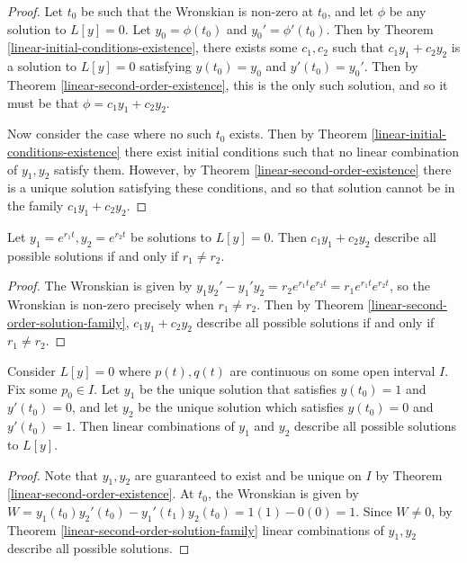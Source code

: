 \begin{proof}
    Let $t_0$ be such that the Wronskian is non-zero at $t_0$, and let $\phi$ be any solution to $L[y] = 0$. Let $y_0 = \phi(t_0)$ and $y_0' = \phi'(t_0)$. Then by Theorem \ref{linear-initial-conditions-existence}, there exists some $c_1, c_2$ such that $c_1y_1 + c_2y_2$ is a solution to $L[y] = 0$ satisfying $y(t_0) = y_0$ and $y'(t_0) = y_0'$. Then by Theorem \ref{linear-second-order-existence}, this is the only such solution, and so it must be that $\phi = c_1y_1 + c_2y_2$.

    Now consider the case where no such $t_0$ exists. Then by Theorem \ref{linear-initial-conditions-existence} there exist initial conditions such that no linear combination of $y_1, y_2$ satisfy them. However, by Theorem \ref{linear-second-order-existence} there is a unique solution satisfying these conditions, and so that solution cannot be in the family $c_1y_1 + c_2y_2$.
\end{proof}

\begin{prop}
    Let $y_1 = e^{r_1t}, y_2 = e^{r_2t}$ be solutions to $L[y] = 0$. Then $c_1y_1 + c_2y_2$ describe all possible solutions if and only if $r_1 \neq r_2$.
\end{prop}

\begin{proof}
    The Wronskian is given by $y_1y_2' - y_1'y_2 = r_2e^{r_1t}e^{r_2t} = r_1e^{r_1t}e^{r_2t}$, so the Wronskian is non-zero precisely when $r_1 \neq r_2$. Then by Theorem \ref{linear-second-order-solution-family}, $c_1y_1 + c_2y_2$ describe all possible solutions if and only if $r_1 \neq r_2$.
\end{proof}

\begin{thm}\label{family-basis-exists}
    Consider $L[y] = 0$ where $p(t), q(t)$ are continuous on some open interval $I$. Fix some $p_0 \in I$. Let $y_1$ be the unique solution that satisfies $y(t_0) = 1$ and $y'(t_0) = 0$, and let $y_2$ be the unique solution which satisfies $y(t_0) = 0$ and $y'(t_0) = 1$. Then linear combinations of $y_1$ and $y_2$ describe all possible solutions to $L[y]$.
\end{thm}

\begin{proof}
    Note that $y_1, y_2$ are guaranteed to exist and be unique on $I$ by Theorem \ref{linear-second-order-existence}. At $t_0$, the Wronskian is given by $W = y_1(t_0)y_2'(t_0) - y_1'(t_1)y_2(t_0) = 1(1) - 0(0) = 1$. Since $W \neq 0$, by Theorem \ref{linear-second-order-solution-family} linear combinations of $y_1, y_2$ describe all possible solutions.
\end{proof}

